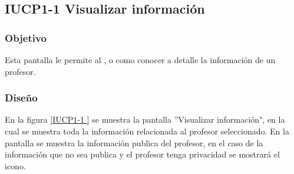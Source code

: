 \subsection{IUCP1-1 Visualizar información}

\subsubsection{Objetivo}

Esta pantalla le permite al ,  o    como conocer a detalle la información de un profesor.

\subsubsection{Diseño}
En la figura \ref{IUCP1-1 } se muestra la pantalla ''Visualizar información", en la cual se muestra toda la información relacionada al profesor seleccionado. 
En la pantalla se muestra la información publica del profesor, en el caso de la información que no sea publica y el profesor tenga privacidad  se mostrará el icono.




